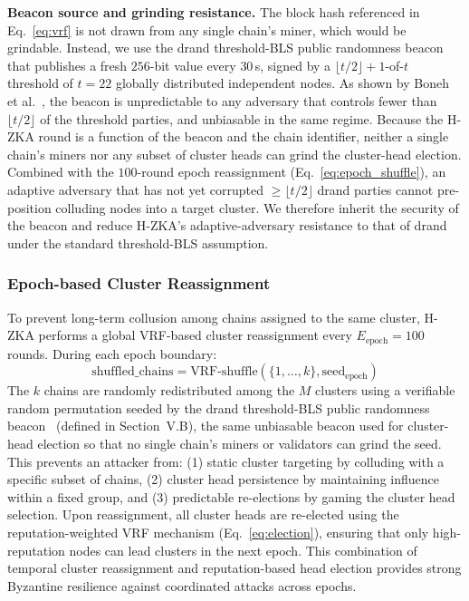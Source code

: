 \documentclass[journal]{IEEEtran}
\begin{document}
\textbf{Beacon source and grinding resistance.} The block hash referenced in Eq.~\ref{eq:vrf} is {not} drawn from any single chain's miner, which would be grindable. Instead, we use the drand threshold-BLS public randomness beacon~\cite{drand} that publishes a fresh $256$-bit value every $30\,$s, signed by a $\lfloor t/2 \rfloor + 1$-of-$t$ threshold of $t = 22$ globally distributed independent nodes. As shown by Boneh et al.~\cite{boneh2018verifiabledelay}, the beacon is unpredictable to any adversary that controls fewer than $\lfloor t/2\rfloor$ of the threshold parties, and unbiasable in the same regime. Because the H-ZKA round is a function of the beacon and the chain identifier, neither a single chain's miners nor any subset of cluster heads can grind the cluster-head election. Combined with the $100$-round epoch reassignment (Eq.~\ref{eq:epoch_shuffle}), an adaptive adversary that has not yet corrupted $\ge \lfloor t/2\rfloor$ drand parties cannot pre-position colluding nodes into a target cluster. We therefore inherit the security of the beacon and reduce H-ZKA's adaptive-adversary resistance to that of drand under the standard threshold-BLS assumption.

\subsubsection{Epoch-based Cluster Reassignment}
To prevent long-term collusion among chains assigned to the same cluster, H-ZKA performs a global VRF-based cluster reassignment every $E_{\text{epoch}} = 100$ rounds. During each epoch boundary:
\begin{equation}
\text{shuffled\_chains} = \text{VRF}\text{-}\text{shuffle}(\{1, \ldots, k\}, \text{seed}_{\text{epoch}})
\label{eq:epoch_shuffle}
\end{equation}
The $k$ chains are randomly redistributed among the $M$ clusters using a verifiable random permutation seeded by the drand threshold-BLS public randomness beacon~\cite{drand} (defined in Section~V.B), the same unbiasable beacon used for cluster-head election so that no single chain's miners or validators can grind the seed. This prevents an attacker from: (1) static cluster targeting by colluding with a specific subset of chains, (2) cluster head persistence by maintaining influence within a fixed group, and (3) predictable re-elections by gaming the cluster head selection. Upon reassignment, all cluster heads are re-elected using the reputation-weighted VRF mechanism (Eq.~\ref{eq:election}), ensuring that only high-reputation nodes can lead clusters in the next epoch. This combination of temporal cluster reassignment and reputation-based head election provides strong Byzantine resilience against coordinated attacks across epochs.
\end{document}

